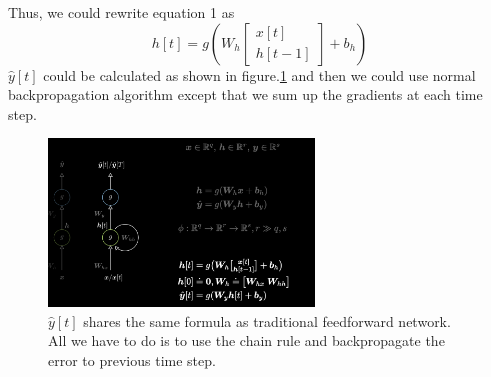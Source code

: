 Thus, we could rewrite equation 1 as 
\begin{equation}
    h[t] = g(W_h\begin{bmatrix}x[t]\\h[t-1]\end{bmatrix} + b_h)
\end{equation}
$\hat{y}[t]$ could be calculated as shown in figure.\ref{fig:bptt_formula} and then we could use normal backpropagation algorithm except that we sum up the gradients at each time step.  
\begin{figure}[ht]
    \centering
    \includegraphics[width=200pt]{figs/bptt_formula.png}
    \caption{$\hat{y}[t]$ shares the same formula as traditional feedforward network. All we have to do is to use the chain rule and backpropagate the error to previous time step.}
    \label{fig:bptt_formula}
\end{figure}



